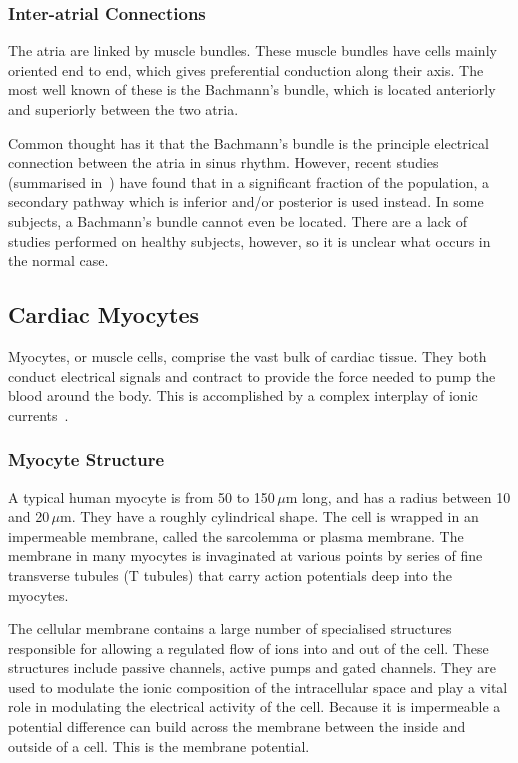 \subsubsection{Inter-atrial Connections}

The atria are linked by muscle bundles.
These muscle bundles have cells mainly oriented end to end, which gives
preferential conduction along their axis.
The most well known of these is the Bachmann's bundle, which is located
anteriorly and superiorly between the two atria.

Common thought has it that the Bachmann's bundle is the principle electrical
connection between the atria in sinus rhythm.
However, recent studies (summarised in~\cite{Platonov2007,Platonov2008a}) have
found that in a significant fraction of the population, a secondary pathway
which is inferior and/or posterior is used instead.
In some subjects, a Bachmann's bundle cannot even be located.
There are a lack of studies performed on healthy subjects, however, so it is
unclear what occurs in the normal case.

\subsection{Cardiac Myocytes}

Myocytes, or muscle cells, comprise the vast bulk of cardiac tissue.
They both conduct electrical signals and contract to provide the force needed to
pump the blood around the body.
This is accomplished by a complex interplay of ionic
currents~\cite{Katz2006}.

\subsubsection{Myocyte Structure}

A typical human myocyte is from 50 to 150$\,\mu$m long, and has a radius
between 10 and 20$\,\mu$m.
They have a roughly cylindrical shape.
The cell is wrapped in an impermeable membrane, called the sarcolemma or plasma
membrane.
The membrane in many myocytes is invaginated at various points by series of
fine transverse tubules (T tubules) that carry action potentials deep into the
myocytes.

The cellular membrane contains a large number of specialised structures
responsible for allowing a regulated flow of ions into and out of the cell.
These structures include passive channels, active pumps and gated channels.
They are used to modulate the ionic composition of the intracellular
space and play a vital role in modulating the electrical activity of the cell.
Because it is impermeable a potential difference can build across the membrane
between the inside and outside of a cell.
This is the membrane potential.

